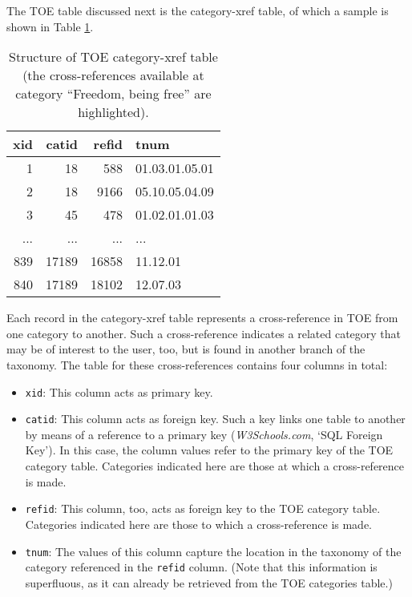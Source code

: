 The TOE table discussed next is the category-xref table, of which a sample is shown in Table \ref{table:Stolk2019b:TOEtable-category-xref}.

\begin{table}[ht]
	\normalsize
	\center
	\setlength\tabcolsep{0.5em}
	\begin{tabular}{|r|r|r|l|}
		\hline
		\normalfont \bfseries xid & \normalfont \bfseries catid & \normalfont \bfseries refid & \normalfont \bfseries tnum \\ \hline
		1       &        18 &       588 & 01.03.01.05.01 \\ \hline
		2       &        18 &      9166 & 05.10.05.04.09 \\ \hline
		3       &        45 &       478 & 01.02.01.01.03 \\ \hline
		...     &       ... &       ... &            ... \\ \hline
\rowcolor{yellow}
		839     &     17189 &     16858 & 11.12.01 \\ \hline
\rowcolor{yellow}
		840     &     17189 &     18102 & 12.07.03 \\ \hline
	\end{tabular}
	\caption{Structure of TOE category-xref table\\
(the cross-references available at category “Freedom, being free” are highlighted).\label{table:Stolk2019b:TOEtable-category-xref}}
\end{table}


Each record in the category-xref table represents a cross-reference in TOE from one category to another. Such a cross-reference indicates a related category that may be of interest to the user, too, but is found in another branch of the taxonomy. The table for these cross-references contains four columns in total:
\begin{itemize}
\item \texttt{xid}: This column acts as primary key.
\item \texttt{catid}: This column acts as foreign key. Such a key links one table to another by means of a reference to a primary key (\textit{W3Schools.com}, ‘SQL Foreign Key’). In this case, the column values refer to the primary key of the TOE category table. Categories indicated here are those at which a cross-reference is made. 
\item \texttt{refid}: This column, too, acts as foreign key to the TOE category table. Categories indicated here are those to which a cross-reference is made.
\item \texttt{tnum}: The values of this column capture the location in the taxonomy of the category referenced in the \texttt{refid} column. (Note that this information is superfluous, as it can already be retrieved from the TOE categories table.)
\end{itemize}

